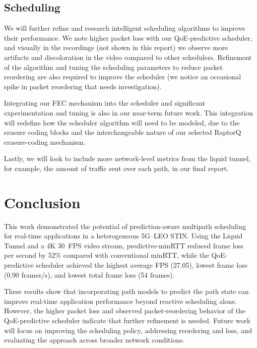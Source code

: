 \documentclass[sigconf,nonacm]{acmart}
\begin{document}
\subsection{Scheduling}
We will further refine and research intelligent scheduling algorithms to improve their performance. We note higher packet loss with our QoE-predictive scheduler, and visually in the recordings (not shown in this report) we observe more artifacts and discoloration in the video compared to other schedulers. Refinement of the algorithm and tuning the scheduling parameters to reduce packet reordering are also required to improve the scheduler (we notice an occasional spike in packet reordering that needs investigation).

Integrating our FEC mechanism into the scheduler and significant experimentation and tuning is also in our near-term future work. This integration will redefine how the scheduler algorithm will need to be modeled, due to the erasure coding blocks and the interchangeable nature of our selected RaptorQ erasure-coding mechanism. 

Lastly, we will look to include more network-level metrics from the liquid tunnel, for example, the amount of traffic sent over each path, in our final report.

\section{Conclusion}
\label{sec:conclusion}

This work demonstrated the potential of prediction-aware multipath scheduling for real-time applications in a heterogeneous 5G--LEO STIN. Using the Liquid Tunnel and a 4K 30~FPS video stream, predictive-minRTT reduced frame loss per second by 52\% compared with conventional minRTT, while the QoE-predictive scheduler achieved the highest average FPS (27.05), lowest frame loss (0.90 frames/s), and lowest total frame loss (54 frames).

These results show that incorporating path models to predict the path state can improve real-time application performance beyond reactive scheduling alone. However, the higher packet loss and observed packet-reordering behavior of the QoE-predictive scheduler indicate that further refinement is needed. Future work will focus on improving the scheduling policy, addressing reordering and loss, and evaluating the approach across broader network conditions.





\end{document}
